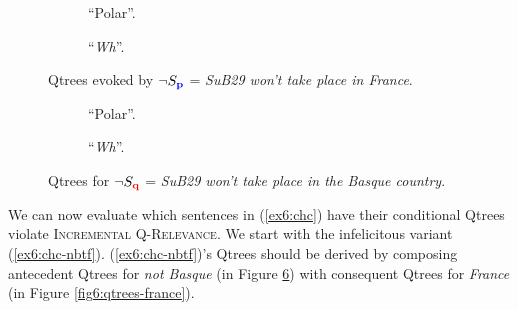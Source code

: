 \begin{figure}[H]
	\centering
	\begin{subfigure}[b]{.45\linewidth}
		\centering
		\caption[]{``Polar''.}\label{fig6:qtree-not-france-polar}
	\end{subfigure}\hfill
	\begin{subfigure}[b]{.45\linewidth}
		\centering
		\caption[]{``\textit{Wh}''.}\label{fig6:qtree-not-france-wh}
	\end{subfigure}
	\caption[]{Qtrees evoked by $\neg S_{\textbf{\textcolor{blue}{p}}}$ = \textit{SuB29 won't take place in France}.}\label{fig6:qtrees-not-france}
\end{figure}

\begin{figure}[H]
	\centering
	\begin{subfigure}[b]{.25\linewidth}
		\centering
		\caption[]{``Polar''.}\label{fig6:qtree-not-basque-polar}
	\end{subfigure}\hfill
	\begin{subfigure}[b]{.65\linewidth}
		\centering
		\caption[]{``\textit{Wh}''.}\label{fig6:qtree-not-basque-wh}
	\end{subfigure}
	\caption[]{Qtrees for $\neg S_{\textbf{\textcolor{red}{q}}}$ = \textit{SuB29 won't take place in the Basque country}.}\label{fig6:qtrees-not-basque}
\end{figure}

We can now evaluate which sentences in (\ref{ex6:chc}) have their conditional Qtrees violate \textsc{Incremental Q-Relevance}. We start with the infelicitous variant (\ref{ex6:chc-nbtf}). (\ref{ex6:chc-nbtf})'s Qtrees should be derived by composing antecedent Qtrees for \textit{not Basque} (in Figure \ref{fig6:qtrees-not-basque}) with consequent Qtrees for \textit{France} (in Figure \ref{fig6:qtrees-france}).

